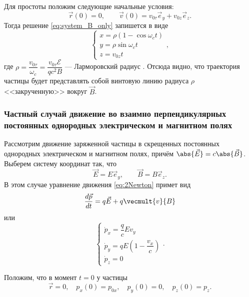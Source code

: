 Для простоты положим следующие начальные условия:
\begin{equation}
\vec{r} (0) = 0, \qquad \vec{v}(0) =  v_{0 \tau} \vec{e}_y + v_{0z} \vec{e}_z.
\end{equation}
Тогда решение \eqref{eq:system_B_only} запишется в виде
\begin{equation}
\begin{cases}
x =  \rho \left( 1 - \cos \omega_c t \right) \\
y =  \rho \sin \omega_c t  \\
z = v_{0z} t
\end{cases},
\label{eq:analytical2}
\end{equation}
где $\rho = \dfrac{v_{0\tau}}{\omega_c} = \dfrac{v_{0 \tau} \mathscr{E}}{qc^2B}$ --- Ларморовский радиус \cite{dnestrovsky}. Отсюда видно, что траектория частицы будет представлять собой винтовую линию радиуса $\rho$ <<закрученную>> вокруг $\vec{B}$.

\subsubsection{Частный случай движение во взаимно перпендикулярных постоянных однородных электрическом и магнитном полях}


Рассмотрим движение заряженной частицы в скрещенных постоянных однородных электрическом и магнитном полях, причём $\abs{\vec{E}} = c \abs{\vec{B}}$. Выберем систему координат так, что
\begin{equation*}
\vec{E} = E  \vec{e}_y, \qquad \vec{B} = B  \vec{e}_z.
\end{equation*}
В этом случае уравнение движения \eqref{eq:2Newton} примет вид
\begin{equation*}
\frac{d \vec{p}}{dt} = q \vec{E} + q \vecmult{v}{B}
\end{equation*}
или
\begin{equation}
\begin{cases}
\dot{p}_x = \dfrac{q}{c} E v_y \\
\dot{p}_y = q E \left( 1 - \dfrac{v_x}{c} \right) \\
\dot{p}_z = 0
\end{cases}.
\label{eq:task3- system}
\end{equation}

Положим, что в момент $t =0$ у частицы
\begin{equation}
\vec{r} = 0, \quad  p_x(0) = p_{0x}, \quad p_y(0) = 0, \quad p_z(0) = p_z. 
\end{equation}

